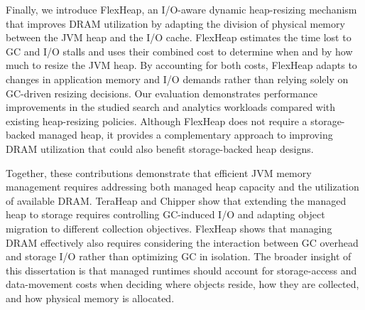 Finally, we introduce FlexHeap, an I/O-aware dynamic heap-resizing mechanism that improves DRAM utilization by adapting the division of physical memory between the JVM heap and the I/O cache.
FlexHeap estimates the time lost to GC and I/O stalls and uses their combined cost to determine when and by how much to resize the JVM heap.
By accounting for both costs, FlexHeap adapts to changes in application memory and I/O demands rather than relying solely on GC-driven resizing decisions.
Our evaluation demonstrates performance improvements in the studied search and analytics workloads compared with existing heap-resizing policies.
Although FlexHeap does not require a storage-backed managed heap, it provides a complementary approach to improving DRAM utilization that could also benefit storage-backed heap designs.

Together, these contributions demonstrate that efficient JVM memory management requires addressing both managed heap capacity and the utilization of available DRAM.
TeraHeap and Chipper show that extending the managed heap to storage requires controlling GC-induced I/O and adapting object migration to different collection objectives.
FlexHeap shows that managing DRAM effectively also requires considering the interaction between GC overhead and storage I/O rather than optimizing GC in isolation.
The broader insight of this dissertation is that managed runtimes should account for storage-access and data-movement costs when deciding where objects reside, how they are collected, and how physical memory is allocated.

